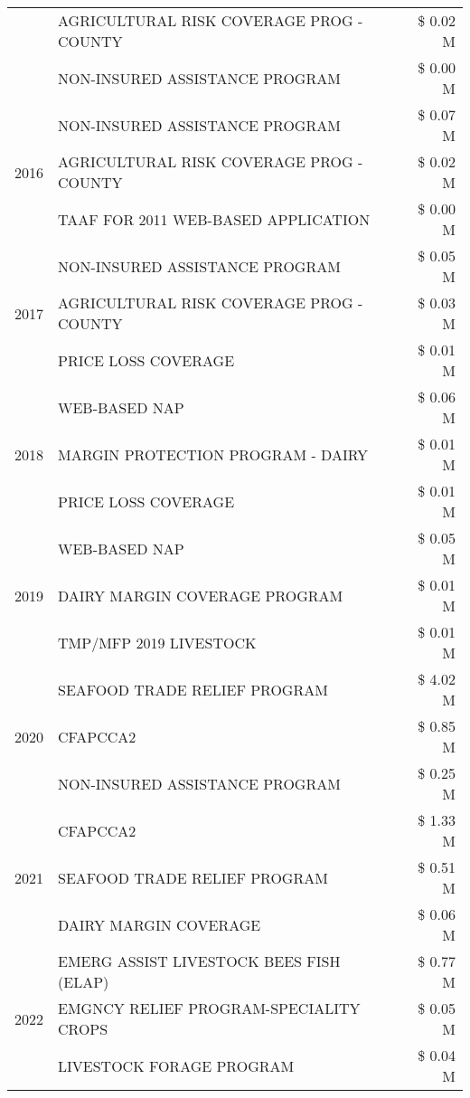 \begin{tabular}{llr}
 & AGRICULTURAL RISK COVERAGE PROG - COUNTY & \$ 0.02 M \\
 & NON-INSURED ASSISTANCE PROGRAM & \$ 0.00 M \\
\cline{1-3}
\multirow[t]{3}{*}{2016} & NON-INSURED ASSISTANCE PROGRAM & \$ 0.07 M \\
 & AGRICULTURAL RISK COVERAGE PROG - COUNTY & \$ 0.02 M \\
 & TAAF FOR 2011 WEB-BASED APPLICATION & \$ 0.00 M \\
\cline{1-3}
\multirow[t]{3}{*}{2017} & NON-INSURED ASSISTANCE PROGRAM & \$ 0.05 M \\
 & AGRICULTURAL RISK COVERAGE PROG - COUNTY & \$ 0.03 M \\
 & PRICE LOSS COVERAGE & \$ 0.01 M \\
\cline{1-3}
\multirow[t]{3}{*}{2018} & WEB-BASED NAP & \$ 0.06 M \\
 & MARGIN PROTECTION PROGRAM - DAIRY & \$ 0.01 M \\
 & PRICE LOSS COVERAGE & \$ 0.01 M \\
\cline{1-3}
\multirow[t]{3}{*}{2019} & WEB-BASED NAP & \$ 0.05 M \\
 & DAIRY MARGIN COVERAGE PROGRAM & \$ 0.01 M \\
 & TMP/MFP 2019 LIVESTOCK & \$ 0.01 M \\
\cline{1-3}
\multirow[t]{3}{*}{2020} & SEAFOOD TRADE RELIEF PROGRAM & \$ 4.02 M \\
 & CFAPCCA2 & \$ 0.85 M \\
 & NON-INSURED ASSISTANCE PROGRAM & \$ 0.25 M \\
\cline{1-3}
\multirow[t]{3}{*}{2021} & CFAPCCA2 & \$ 1.33 M \\
 & SEAFOOD TRADE RELIEF PROGRAM & \$ 0.51 M \\
 & DAIRY MARGIN COVERAGE & \$ 0.06 M \\
\cline{1-3}
\multirow[t]{3}{*}{2022} & EMERG ASSIST LIVESTOCK BEES FISH (ELAP) & \$ 0.77 M \\
 & EMGNCY RELIEF PROGRAM-SPECIALITY CROPS & \$ 0.05 M \\
 & LIVESTOCK FORAGE PROGRAM & \$ 0.04 M \\
\cline{1-3}
\bottomrule
\end{tabular}
